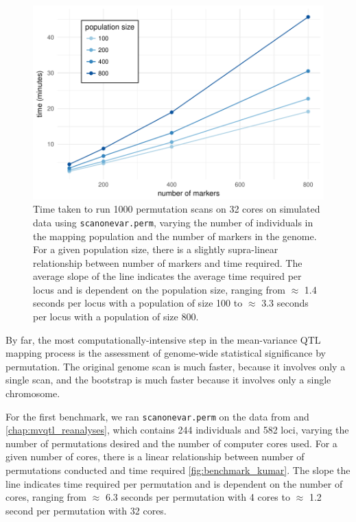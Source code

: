 \begin{figure}[t]
    \includegraphics[width = \linewidth]{images/benchmark_sim_cross.pdf}
    \caption[
        Time taken to run 1000 permutation scans on 32 cores on simulated data using \texttt{scanonevar.perm}, varying the number of individuals in the mapping population and the number of markers in the genome.
    ]
    {
        Time taken to run 1000 permutation scans on 32 cores on simulated data using \texttt{scanonevar.perm}, varying the number of individuals in the mapping population and the number of markers in the genome.
        For a given population size, there is a slightly supra-linear relationship between number of markers and time required.
        The average slope of the line indicates the average time required per locus and is dependent on the population size, ranging from $\approx$ 1.4 seconds per locus with a population of size 100 to $\approx$ 3.3 seconds per locus with a population of size 800.
    }
    \label{fig:benchmark_sim_cross}
\end{figure}

By far, the most computationally-intensive step in the mean-variance QTL mapping process is the assessment of genome-wide statistical significance by permutation.
The original genome scan is much faster, because it involves only a single scan, and the bootstrap is much faster because it involves only a single chromosome.

For the first benchmark, we ran \texttt{scanonevar.perm} on the data from \citet{Kumar2013} and \autoref{chap:mvqtl_reanalyses}, which contains 244 individuals and 582 loci, varying the number of permutations desired and the number of computer cores used.
For a given number of cores, there is a linear relationship between number of permutations conducted and time required \autoref{fig:benchmark_kumar}.
The slope the line indicates time required per permutation and is dependent on the number of cores, ranging from $\approx$ 6.3 seconds per permutation with 4 cores to $\approx$ 1.2 second per permutation with 32 cores.

